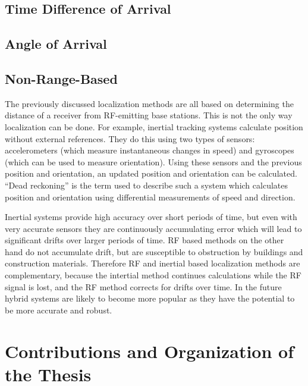\subsection{Time Difference of Arrival }

\subsection{Angle of Arrival }

\subsection{Non-Range-Based}

The previously discussed localization methods are all based on determining the distance of a receiver from RF-emitting base stations. This is not the only way localization can be done. For example, inertial tracking systems calculate position without external references. They do this using two types of sensors: accelerometers (which measure instantaneous changes in speed) and gyroscopes (which can be used to measure orientation). Using these sensors and the previous position and orientation, an updated position and orientation can be calculated. ``Dead reckoning'' is the term used to describe such a system which calculates position and orientation using differential measurements of speed and direction.

Inertial systems provide high accuracy over short periods of time, but even with very accurate sensors they are continuously accumulating error which will lead to significant drifts over larger periods of time. RF based methods on the other hand do not accumulate drift, but are susceptible to obstruction by buildings and construction materials. Therefore RF and inertial based localization methods are complementary, because the intertial method continues calculations while the RF signal is lost, and the RF method corrects for drifts over time. In the future hybrid systems are likely to become more popular as they have the potential to be more accurate and robust.

%
%
% 
%
%
%
%

\section{Contributions and Organization of the Thesis}

